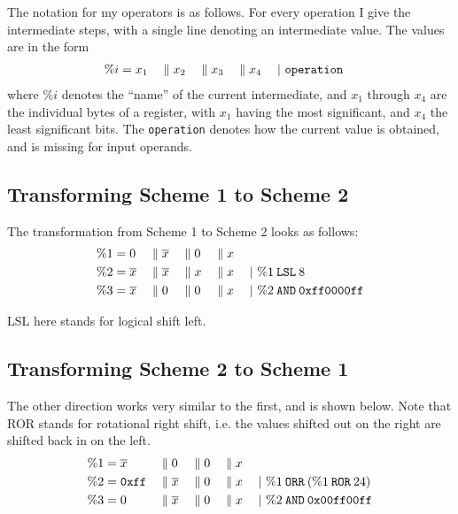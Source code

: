 The notation for my operators is as follows.
For every operation I give the intermediate steps, with a single line denoting an intermediate value.
The values are in the form
\begin{align*}
  \%i &= x_1 &&\; \| \; x_2 &&\; \| \; x_3 &&\; \| \; x_4 && \;|\ \texttt{operation}
\end{align*}
where $\%i$ denotes the ``name'' of the current intermediate, and $x_1$ through $x_4$ are the individual bytes of a register, with $x_1$ having the most significant, and $x_4$ the least significant bits.
The \texttt{operation} denotes how the current value is obtained, and is missing for input operands.


\subsection{Transforming Scheme 1 to Scheme 2}
The transformation from Scheme 1 to Scheme 2 looks as follows:
\begin{align*}
  \%1 &= 0 &&\; \| \; \overline{x} &&\; \| \; 0 &&\; \| \; x &&\\
  \%2 &= \overline{x} &&\; \| \; \overline{x} &&\; \| \; x &&\; \| \; x && \;|\ \%1 \mathbin{\texttt{LSL}} 8\\
  \%3 &= \overline{x} &&\; \| \; 0 &&\; \| \; 0 &&\; \| \; x && \;|\ \%2 \mathbin{\texttt{AND}} \texttt{0xff0000ff}
\end{align*}

LSL here stands for logical shift left.

\subsection{Transforming Scheme 2 to Scheme 1}
The other direction works very similar to the first, and is shown below.
Note that ROR stands for rotational right shift, i.e. the values shifted out on the right are shifted back in on the left.
\begin{align*}
  \%1 &= \overline{x} &&\; \| \; 0 &&\; \| \; 0 &&\; \| \; x &&\\
  \%2 &= \texttt{0xff} &&\; \| \; \overline{x} &&\; \| \; 0 &&\; \| \; x && \;|\ \%1 \mathbin{\texttt{ORR}} (\%1 \mathbin{\texttt{ROR}} 24)\\
  \%3 &= 0 &&\; \| \; \overline{x} &&\; \| \; 0 &&\; \| \; x && \;|\ \%2 \mathbin{\texttt{AND}} \texttt{0x00ff00ff}
\end{align*}

